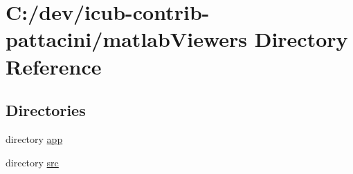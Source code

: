 \section{C\+:/dev/icub-\/contrib-\/pattacini/matlab\+Viewers Directory Reference}
\label{dir_a08da7a4f9faa5fb7a138f32a3b5b103}
\subsection*{Directories}
\begin{DoxyCompactItemize}
\item 
directory \hyperlink{dir_e91a887e2f6487024fb4b5250673d8ec}{app}
\item 
directory \hyperlink{dir_acab2c3e53afd6c8b3208e4a35ae300f}{src}
\end{DoxyCompactItemize}
